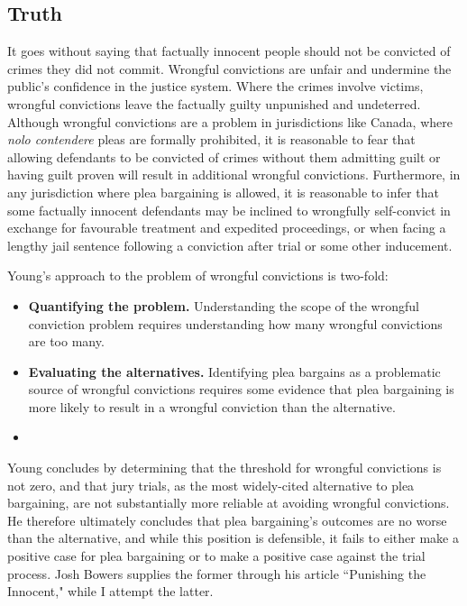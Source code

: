 \subsection{Truth}

It goes without saying that factually innocent people should not be convicted of crimes they did not commit. Wrongful convictions are unfair and undermine the public's confidence in the justice system. Where the crimes involve victims, wrongful convictions leave the factually guilty unpunished and undeterred. Although wrongful convictions are a problem in jurisdictions like Canada, where \textit{nolo contendere} pleas are formally prohibited, it is reasonable to fear that allowing defendants to be convicted of crimes without them admitting guilt or having guilt proven will result in additional wrongful convictions. Furthermore, in any jurisdiction where plea bargaining is allowed, it is reasonable to infer that some factually innocent defendants may be inclined to wrongfully self-convict in exchange for favourable treatment and expedited proceedings, or when facing a lengthy jail sentence following a conviction after trial or some other inducement. 

Young's approach to the problem of wrongful convictions is two-fold:

\begin{itemize}
    \item \textbf{Quantifying the problem.} Understanding the scope of the wrongful conviction problem requires understanding how many wrongful convictions are too many.
    \item \textbf{Evaluating the alternatives.} Identifying plea bargains as a problematic source of wrongful convictions requires some evidence that plea bargaining is more likely to result in a wrongful conviction than the alternative.
    \item 
\end{itemize}

Young concludes by determining that the threshold for wrongful convictions is not zero, and that jury trials, as the most widely-cited alternative to plea bargaining, are not substantially more reliable at avoiding wrongful convictions. He therefore ultimately concludes that plea bargaining's outcomes are no worse than the alternative, and while this position is defensible, it fails to either make a positive case for plea bargaining or to make a positive case against the trial process. Josh Bowers supplies the former through his article ``Punishing the Innocent," while I attempt the latter.

